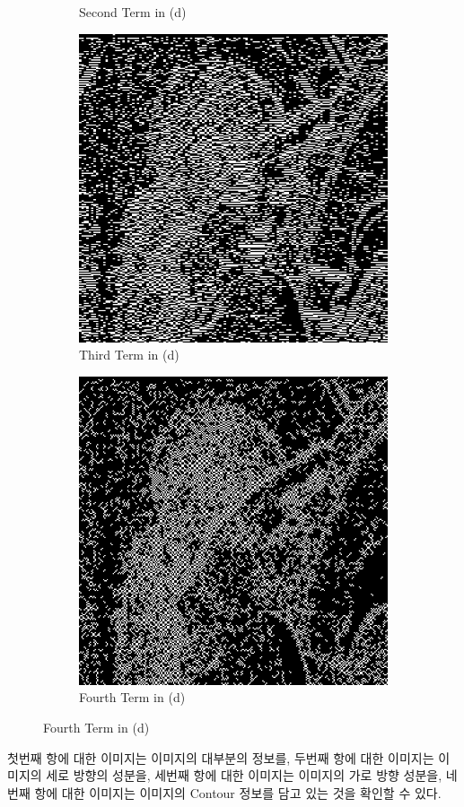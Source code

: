 \begin{figure}[H]
\begin{subfigure}[b]{0.45\textwidth}
        \caption{Second Term in (d)}
    \end{subfigure}
    \hfill
    \begin{subfigure}[b]{0.45\textwidth}
        \centering
        \includegraphics[width=\textwidth]{problem3/dTerm3.bmp}
        \caption{Third Term in (d)}
    \end{subfigure}
    \hfill
    \begin{subfigure}[b]{0.45\textwidth}
        \centering
        \includegraphics[width=\textwidth]{problem3/dTerm4.bmp}
        \caption{Fourth Term in (d)}
    \end{subfigure}
\end{figure}
첫번째 항에 대한 이미지는 이미지의 대부분의 정보를, 두번째 항에 대한 이미지는 이미지의 세로 방향의 성분을, 세번째 항에 대한 이미지는 이미지의 가로 방향 성분을, 네번째 항에 대한 이미지는 이미지의 Contour 정보를 담고 있는 것을 확인할 수 있다.

